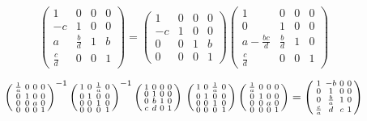 \documentclass[11pt]{amsart}
\begin{document}
$$
	\left(\begin{smallmatrix}
		1 & 0 & 0 & 0 \\
		-c & 1 & 0 & 0 \\
		a & \frac{b}{d} & 1 & b \\
		\frac{c}{d} & 0 & 0 & 1
	\end{smallmatrix}\right) = \left(\begin{smallmatrix}
		1 & 0 & 0 & 0 \\
		-c & 1 & 0 & 0 \\
		0 & 0 & 1 & b \\
		0 & 0 & 0 & 1
	\end{smallmatrix}\right)\left(\begin{smallmatrix}
		1 & 0 & 0 & 0 \\
		0 & 1 & 0 & 0 \\
		a - \frac{b c}{d} & \frac{b}{d} & 1 & 0 \\
		\frac{c}{d} & 0 & 0 & 1
	\end{smallmatrix}\right) 
$$

$$
	\left(\begin{smallmatrix}
		\frac{1}{a} & 0 & 0 & 0 \\
		0 & 1 & 0 & 0 \\
		0 & 0 & a & 0 \\
		0 & 0 & 0 & 1
	\end{smallmatrix}\right)^{-1}
	\left(\begin{smallmatrix}
		1 & 0 & \frac{1}{a} & 0 \\
		0 & 1 & 0 & 0 \\
		0 & 0 & 1 & 0 \\
		0 & 0 & 0 & 1
	\end{smallmatrix}\right)^{-1}
	\left(\begin{smallmatrix}
		1 & 0 & 0 & 0 \\
		0 & 1 & 0 & 0 \\
		0 & b & 1 & 0 \\
		c & d & 0 & 1
	\end{smallmatrix}\right) \\
	\left(\begin{smallmatrix}
		1 & 0 & \frac{1}{a} & 0 \\
		0 & 1 & 0 & 0 \\
		0 & 0 & 1 & 0 \\
		0 & 0 & 0 & 1
	\end{smallmatrix}\right)
	\left(\begin{smallmatrix}
		\frac{1}{a} & 0 & 0 & 0 \\
		0 & 1 & 0 & 0 \\
		0 & 0 & a & 0 \\
		0 & 0 & 0 & 1
	\end{smallmatrix}\right) = \left(\begin{smallmatrix}
		1 & -b & 0 & 0 \\
		0 & 1 & 0 & 0 \\
		0 & \frac{b}{a} & 1 & 0 \\
		\frac{c}{a} & d & c & 1
	\end{smallmatrix}\right) 
$$
\end{document}
